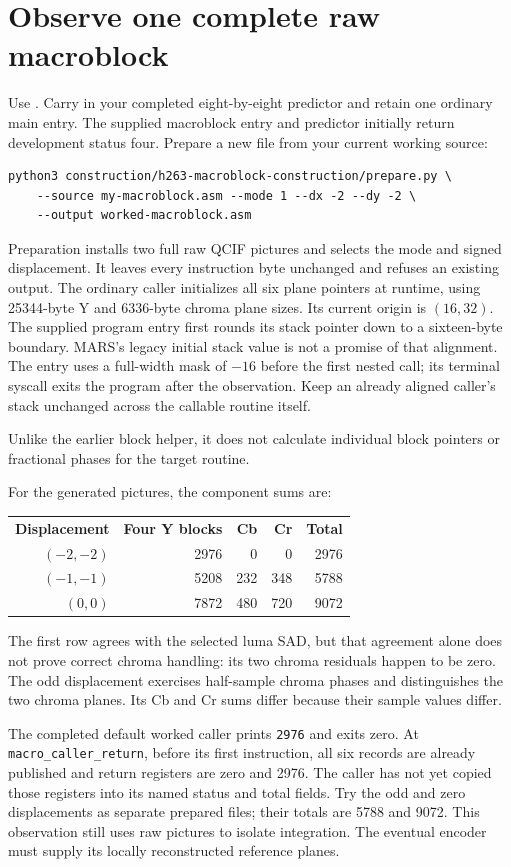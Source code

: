 \section{Observe one complete raw macroblock}
Use . Carry in your completed
eight-by-eight predictor and retain one ordinary main entry. The supplied
macroblock entry and predictor initially return development status four.
Prepare a new file from your current working source:
\begin{verbatim}
python3 construction/h263-macroblock-construction/prepare.py \
    --source my-macroblock.asm --mode 1 --dx -2 --dy -2 \
    --output worked-macroblock.asm
\end{verbatim}
Preparation installs two full raw QCIF pictures and selects the mode and signed
displacement. It leaves every instruction byte unchanged and refuses an existing
output. The ordinary caller initializes all six plane pointers at runtime, using
25344-byte Y and 6336-byte chroma plane sizes. Its current origin is $(16,32)$.
The supplied program entry first rounds its stack pointer down to a sixteen-byte
boundary. MARS's legacy initial stack value is not a promise of that alignment.
The entry uses a full-width mask of $-16$ before the first nested call; its
terminal syscall exits the program after the observation. Keep an already aligned
caller's stack unchanged across the callable routine itself.

Unlike the earlier block helper, it does not calculate individual block pointers
or fractional phases for the target routine.

For the generated pictures, the component sums are:
\begin{center}
  \tagpdfsetup{table/header-rows={1}}
  \begin{tabular}{rrrrr}
    \textbf{Displacement} & \textbf{Four Y blocks} & \textbf{Cb} & \textbf{Cr} & \textbf{Total} \\
    $(-2,-2)$             & 2976                   & 0           & 0           & 2976           \\
    $(-1,-1)$             & 5208                   & 232         & 348         & 5788           \\
    $(0,0)$               & 7872                   & 480         & 720         & 9072
  \end{tabular}
\end{center}
The first row agrees with the selected luma SAD, but that agreement alone does
not prove correct chroma handling: its two chroma residuals happen to be zero.
The odd displacement exercises half-sample chroma phases and distinguishes the
two chroma planes. Its Cb and Cr sums differ because their sample values differ.

The completed default worked caller prints \texttt{2976} and exits zero.
At \texttt{macro\_caller\_return}, before its first instruction, all six records
are already published and return registers are zero and 2976. The caller has not
yet copied those registers into its named status and total fields. Try the odd
and zero displacements as separate prepared files; their totals are 5788 and 9072.
This observation still uses raw pictures to isolate integration. The eventual
encoder must supply its locally reconstructed reference planes.
